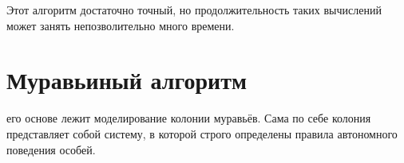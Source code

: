 Этот алгоритм достаточно точный, но продолжительность таких вычислений может занять непозволительно много времени.\\

\section{Муравьиный алгоритм}
 его основе лежит моделирование колонии муравьёв. Сама по себе колония представляет собой систему, в которой строго определены правила автономного поведения особей.